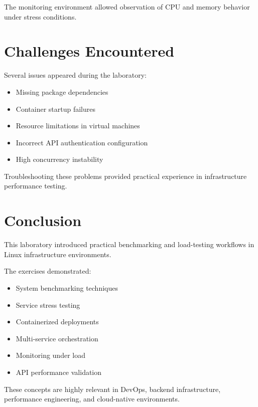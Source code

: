 \documentclass[11pt,a4paper]{article}
\begin{document}
The monitoring environment allowed observation of CPU and memory behavior under stress conditions.

\section{Challenges Encountered}

Several issues appeared during the laboratory:
\begin{itemize}
    \item Missing package dependencies
    \item Container startup failures
    \item Resource limitations in virtual machines
    \item Incorrect API authentication configuration
    \item High concurrency instability
\end{itemize}

Troubleshooting these problems provided practical experience in infrastructure performance testing.

\section{Conclusion}

This laboratory introduced practical benchmarking and load-testing workflows in Linux infrastructure environments.

The exercises demonstrated:
\begin{itemize}
    \item System benchmarking techniques
    \item Service stress testing
    \item Containerized deployments
    \item Multi-service orchestration
    \item Monitoring under load
    \item API performance validation
\end{itemize}

These concepts are highly relevant in DevOps, backend infrastructure, performance engineering, and cloud-native environments.
\end{document}
